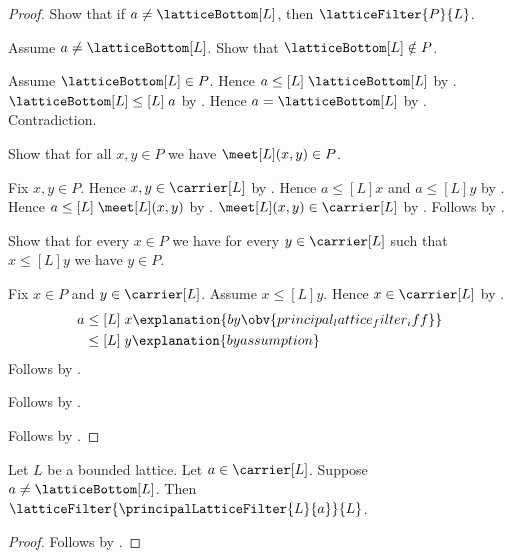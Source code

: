 \begin{proof}
    Show that if $a\neq\latticeBottom[L]$, then
        $\latticeFilter{P}{L}$.
    \begin{subproof}
        Assume $a\neq\latticeBottom[L]$.
        Show that $\latticeBottom[L]\notin P$.
        \begin{subproof}
            Assume $\latticeBottom[L]\in P$.
            Hence $a\mathrel{\leq[L]}\latticeBottom[L]$ by
                .
            $\latticeBottom[L]\mathrel{\leq[L]}a$ by
                .
            Hence $a=\latticeBottom[L]$ by
                .
            Contradiction.
        \end{subproof}
        Show that for all $x,y\in P$ we have $\meet[L](x,y)\in P$.
        \begin{subproof}
            Fix $x,y\in P$.
            Hence $x,y\in\carrier[L]$ by .
            Hence $a\mathrel{\leq[L]}x$ and
                $a\mathrel{\leq[L]}y$ by
                .
            Hence $a\mathrel{\leq[L]}\meet[L](x,y)$ by
                .
            $\meet[L](x,y)\in\carrier[L]$ by .
            Follows by .
        \end{subproof}
        Show that for every $x\in P$ we have
            for every $y\in\carrier[L]$ such that
                $x\mathrel{\leq[L]}y$ we have $y\in P$.
        \begin{subproof}
            Fix $x\in P$ and $y\in\carrier[L]$.
            Assume $x\mathrel{\leq[L]}y$.
            Hence $x\in\carrier[L]$ by .
            \begin{align*}
                a
                    &\mathrel{\leq[L]} x
                        \explanation{by \obv{principal_lattice_filter_iff}}
                        \\
                    &\mathrel{\leq[L]} y
                        \explanation{by assumption}
            \end{align*}
            Follows by .
        \end{subproof}
        Follows by .
    \end{subproof}
    Follows by \auto.
\end{proof}

\begin{theorem}\label{principal_lattice_filter_is_filter}
    Let $L$ be a bounded lattice.
    Let $a\in\carrier[L]$.
    Suppose $a\neq\latticeBottom[L]$.
    Then $\latticeFilter{\principalLatticeFilter{L}{a}}{L}$.
\end{theorem}
\begin{proof}
    Follows by
        .
\end{proof}

